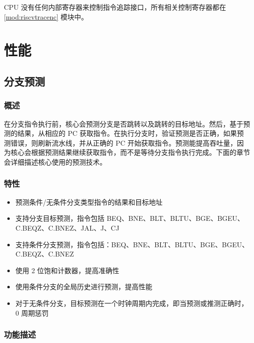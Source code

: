 \documentclass[main\_\_CN.tex]{subfiles}
\begin{document}
CPU 没有任何内部寄存器来控制指令追踪接口，所有相关控制寄存器都在 \ref{mod:riscvtracenc} \textit{} 模块中。

\newpage
\section{性能}
\label{sec:riscvcpu-perf-enhancements}


\subsection{分支预测}
\label{sec:riscvcpu-perf-bp}

\subsubsection{概述}
\label{sec:riscvcpu-perf-bp-overview}
在分支指令执行前，核心会预测分支是否跳转以及跳转的目标地址。然后，基于预测的结果，从相应的 PC 获取指令。在执行分支时，验证预测是否正确，如果预测错误，则刷新流水线，并从正确的 PC 开始获取指令。预测能提高吞吐量，因为核心会根据预测结果继续获取指令，而不是等待分支指令执行完成。下面的章节会详细描述核心使用的预测技术。

\subsubsection{特性}
\label{sec:riscvcpu-perf-bp-features}
\begin{itemize}
    \item 预测条件/无条件分支类型指令的结果和目标地址
    \item 支持分支目标预测，指令包括 BEQ、BNE、BLT、BLTU、BGE、BGEU、C.BEQZ、C.BNEZ、JAL、J、CJ
    \item 支持条件分支预测，指令包括：BEQ、BNE、BLT、BLTU、BGE、BGEU、C.BEQZ、C.BNEZ
    \item 使用 2 位饱和计数器，提高准确性
    \item 使用条件分支的全局历史进行预测，提高性能
    \item 对于无条件分支，目标预测在一个时钟周期内完成，即当预测或推测正确时，0 周期惩罚
\end{itemize}

\subsubsection{功能描述}
\label{sec:riscvcpu-perf-bp-func-descr}
\end{document}
